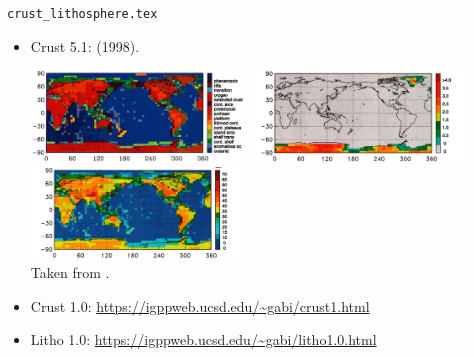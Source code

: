 \begin{flushright} {\tiny {\color{gray} \tt crust\_lithosphere.tex}} \end{flushright}

\begin{itemize}
\item Crust 5.1: \textcite{molm98} (1998).

\begin{center}
\includegraphics[width=5.7cm]{images/crust51/molm98a}
\includegraphics[width=5.7cm]{images/crust51/molm98b}
\includegraphics[width=5.7cm]{images/crust51/molm98c}\\
{\captionfont Taken from \textcite{molm98}.}
\end{center}

\item Crust 1.0:  \url{https://igppweb.ucsd.edu/~gabi/crust1.html}

\item Litho 1.0: \url{https://igppweb.ucsd.edu/~gabi/litho1.0.html}

\end{itemize}
